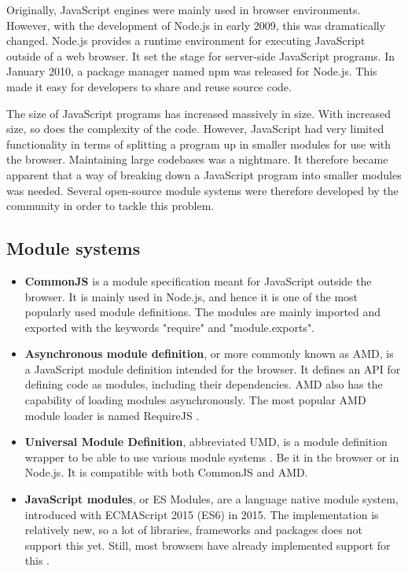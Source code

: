 Originally, JavaScript engines were mainly used in browser environments. However, with the development of Node.js in early 2009, this was dramatically changed. Node.js provides a runtime environment for executing JavaScript outside of a web browser. It set the stage for server-side JavaScript programs. In January 2010, a package manager named npm \cite{npm} was released for Node.js. This made it easy for developers to share and reuse source code.

The size of JavaScript programs has increased massively in size. With increased size, so does the complexity of the code. However, JavaScript had very limited functionality in terms of splitting a program up in smaller modules for use with the browser. Maintaining large codebases was a nightmare. It therefore became apparent that a way of breaking down a JavaScript program into smaller modules was needed. Several open-source module systems were therefore developed by the community in order to tackle this problem.

\subsection{Module systems}
\label{sec:theory-module-system}
\begin{itemize}
    \item \textbf{CommonJS} is a module specification meant for JavaScript outside the browser. It is mainly used in Node.js, and hence it is one of the most popularly used module definitions. The modules are mainly imported and exported with the keywords "require" and "module.exports".
    \item \textbf{Asynchronous module definition}, or more commonly known as AMD, is a JavaScript module definition intended for the browser. It defines an API for defining code as modules, including their dependencies. AMD also has the capability of loading modules asynchronously. The most popular AMD module loader is named RequireJS \cite{requirejs}.
    \item \textbf{Universal Module Definition}, abbreviated UMD, is a module definition wrapper to be able to use various module systems \cite{universal-module-definition}. Be it in the browser or in Node.js. It is compatible with both CommonJS and AMD.
    \item \textbf{JavaScript modules}, or ES Modules, are a language native module system, introduced with ECMAScript 2015 (ES6) in 2015. The implementation is relatively new, so a lot of libraries, frameworks and packages does not support this yet. Still, most browsers have already implemented support for this \cite{es-modules-support}.
\end{itemize}

